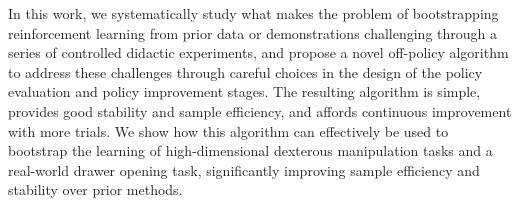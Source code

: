 

In this work, we systematically study what makes the problem of bootstrapping reinforcement learning from prior data or demonstrations
challenging through a series of controlled didactic experiments,
and propose a novel off-policy algorithm to address these challenges through careful choices in the design of the policy evaluation and policy improvement stages. The resulting algorithm is simple, provides good stability and sample efficiency, and affords continuous improvement with more trials. We show how this algorithm can effectively be used to bootstrap the learning of high-dimensional dexterous manipulation tasks and a real-world drawer opening task, significantly improving sample efficiency and stability over prior methods.


